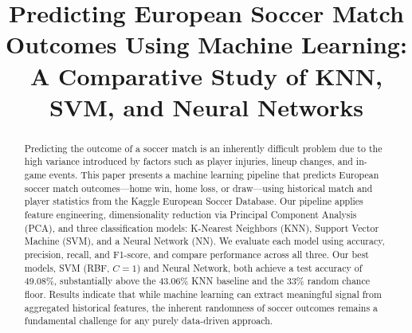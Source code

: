 \documentclass[conference]{IEEEtran}
\begin{document}
\title{Predicting European Soccer Match Outcomes Using Machine Learning:
A Comparative Study of KNN, SVM, and Neural Networks}

\author{
  \and
  \and
}

\maketitle

\begin{abstract}
Predicting the outcome of a soccer match is an inherently difficult problem due to the high variance introduced by factors such as player injuries, lineup changes, and in-game events. This paper presents a machine learning pipeline that predicts European soccer match outcomes---home win, home loss, or draw---using historical match and player statistics from the Kaggle European Soccer Database. Our pipeline applies feature engineering, dimensionality reduction via Principal Component Analysis (PCA), and three classification models: K-Nearest Neighbors (KNN), Support Vector Machine (SVM), and a Neural Network (NN). We evaluate each model using accuracy, precision, recall, and F1-score, and compare performance across all three. Our best models, SVM (RBF, $C=1$) and Neural Network, both achieve a test accuracy of 49.08\%, substantially above the 43.06\% KNN baseline and the 33\% random chance floor. Results indicate that while machine learning can extract meaningful signal from aggregated historical features, the inherent randomness of soccer outcomes remains a fundamental challenge for any purely data-driven approach.
\end{abstract}
\end{document}
